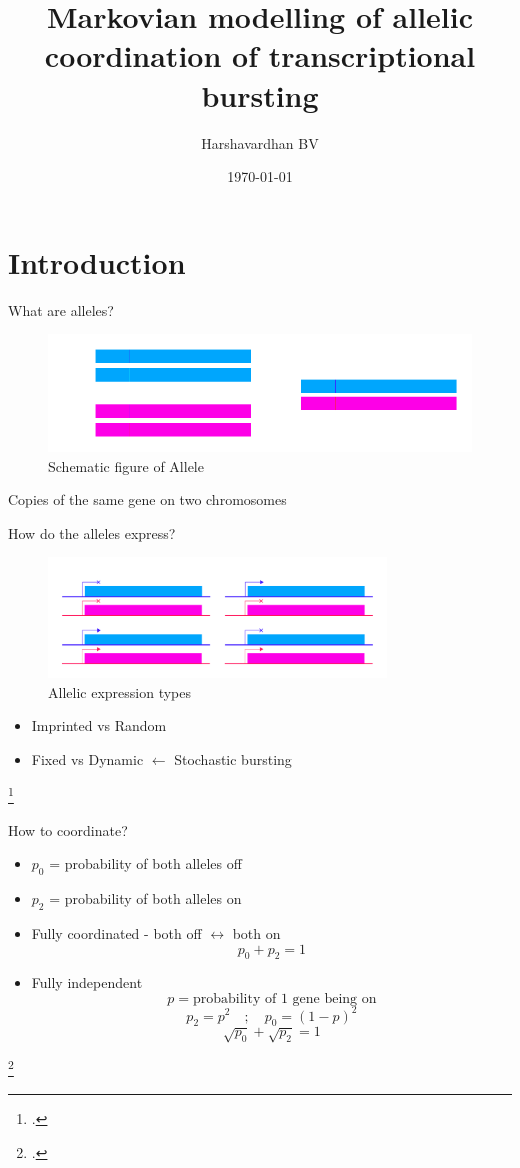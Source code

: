 \documentclass[aspectratio=169,9pt]{beamer}
\title{Markovian modelling of allelic coordination of transcriptional bursting}
\author{Harshavardhan BV}
\date{\today}
\institute{IISc Bangalore}
\begin{document}
\frame{\titlepage}

\section{Introduction}
\begin{frame}{What are alleles?}
  \begin{figure}
    \includegraphics[width=\textwidth]{allele}
    \caption{Schematic figure of Allele}
  \end{figure}
 \pause Copies of the same gene on two chromosomes
\end{frame}

\begin{frame}{How do the alleles express?}
  \begin{figure}
    \centering
    \includegraphics[width=0.8\textwidth]{allelic}
    \caption{Allelic expression types}
  \end{figure}
  \begin{itemize}
    \item \pause Imprinted vs Random
    \item \pause Fixed vs Dynamic \pause $\leftarrow$ Stochastic bursting
  \end{itemize}
  \footcite{Singer2010}
\end{frame}

\begin{frame}{How to coordinate?}
  \begin{itemize}
    \item $p_0$ = probability of both alleles off
    \item $p_2$ = probability of both alleles on
    \item \pause Fully coordinated - both off $	\longleftrightarrow$ both on
    $$p_{0} + p_{2} = 1$$
    \item \pause Fully independent 
    $$p = \text{probability of 1 gene being on}$$
    $$p_2 = p^2 \quad ; \quad p_0 = (1-p)^2$$
    $$\sqrt{p_0} + \sqrt{p_2} = 1$$
  \end{itemize} 
  \footcite{Naik2021}
\end{frame}
\end{document}
